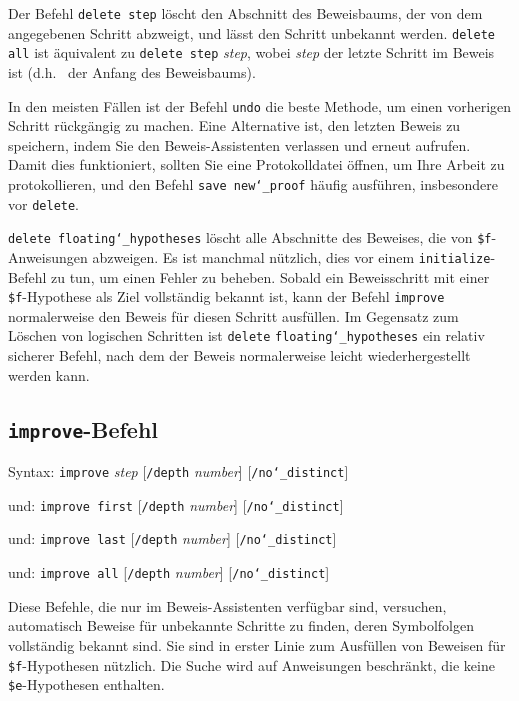 Der Befehl \texttt{delete step} löscht den Abschnitt des Beweisbaums, der von dem angegebenen Schritt abzweigt, und lässt den Schritt unbekannt werden. \texttt{delete all} ist äquivalent zu \texttt{delete step} {\em step}, wobei {\em step} der letzte Schritt im Beweis ist (d.h. \ der Anfang des Beweisbaums).

In den meisten Fällen ist der Befehl \texttt{undo} die beste Methode, um einen vorherigen Schritt rückgängig zu machen. Eine Alternative ist, den letzten Beweis zu speichern, indem Sie den Beweis-Assistenten verlassen und erneut aufrufen. Damit dies funktioniert, sollten Sie eine Protokolldatei öffnen, um Ihre Arbeit zu protokollieren, und den Befehl \texttt{save new{\char`\_}proof} häufig ausführen, insbesondere vor \texttt{delete}.

\texttt{delete floating{\char`\_}hypotheses} löscht alle Abschnitte des Beweises, die von \texttt{\$f}-Anweisungen abzweigen.  Es ist manchmal nützlich, dies vor einem \texttt{initialize}-Befehl zu tun, um einen Fehler zu beheben.  Sobald ein Beweis\-schritt mit einer \texttt{\$f}-Hypothese als Ziel vollständig bekannt ist, kann der Befehl \texttt{improve} normalerweise den Beweis für diesen Schritt ausfüllen.  Im Gegensatz zum Löschen von logischen Schritten ist \texttt{delete} \texttt{floating{\char`\_}hypotheses} ein relativ sicherer Befehl, nach dem der Beweis normalerweise leicht wiederhergestellt werden kann.


\subsection{\texttt{improve}-Befehl}
\label{improve}

Syntax:  \texttt{improve} {\em step} [\texttt{/depth} {\em number}]
                                               [\texttt{/no{\char`\_}distinct}]

   und:   \texttt{improve first} [\texttt{/depth} {\em number}]
                                              [\texttt{/no{\char`\_}distinct}]

   und:   \texttt{improve last} [\texttt{/depth} {\em number}]
                                              [\texttt{/no{\char`\_}distinct}]

   und:   \texttt{improve all} [\texttt{/depth} {\em number}]
                                              [\texttt{/no{\char`\_}distinct}]

Diese Befehle, die nur im Beweis-Assistenten verfügbar sind, versuchen, automatisch Beweise für unbekannte Schritte zu finden, deren Symbolfolgen vollständig bekannt sind.  Sie sind in erster Linie zum Ausfüllen von Beweisen für \texttt{\$f}-Hypothesen nützlich.  Die Suche wird auf Anweisungen beschränkt, die keine \texttt{\$e}-Hypothesen enthalten.


